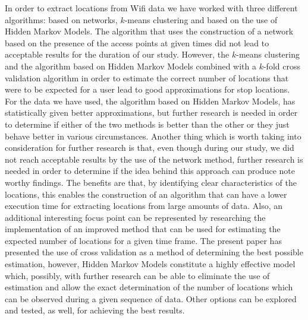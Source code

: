 In order to extract locations from Wifi data we have worked with three different
algorithms: based on networks, $k$-means clustering and based on the use of
Hidden Markov Models. The algorithm that uses the construction of a network based on
the presence of the access points at given times did not lead to acceptable
results for the duration of our study. However, the $k$-means clustering and the
algorithm based on Hidden Markov Models combined with a $k$-fold cross
validation algorithm in order to estimate the correct number of locations that were to be
expected for a user lead to good approximations for stop locations. For the data
we have used, the algorithm based on Hidden Markov Models, has statistically
given better approximations, but further research is needed in order to
determine if either of the two methods is better than the other or they just
behave better in various circumstances. Another thing which is worth taking into
consideration for further research is that, even though during our study, we did
not reach acceptable results by the use of the network method, further research
is needed in order to determine if the idea behind this approach can produce
note worthy findings. The benefits are that, by identifying clear
characteristics of the locations, this enables the construction of an algorithm
that can have a lower execution time for extracting locations from large amounts
of data. Also, an additional interesting focus point can be represented by
researching the implementation of an improved method that can be used for
estimating the expected number of locations for a given time frame. The present
paper has presented the use of cross validation as a method of determining the
best possible estimation, however, Hidden Markov Models constitute a highly
effective model which, possibly, with further research can be able to eliminate
the use of estimation and allow the exact determination of the number of
locations which can be observed during a given sequence of data. Other options
can be explored and tested, as well, for achieving the best results.

